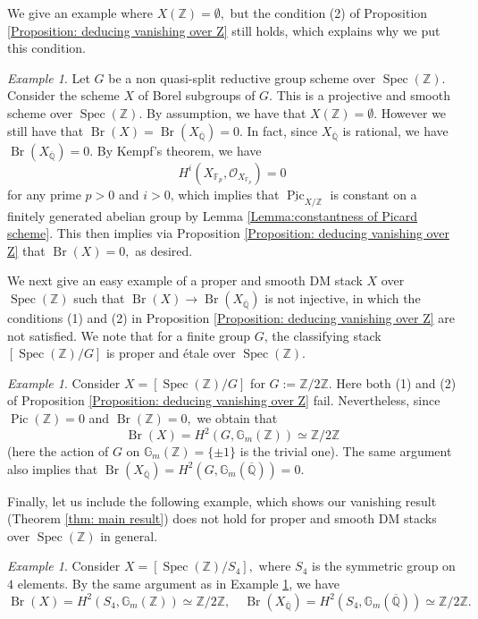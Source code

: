 \documentclass{amsart}
\theoremstyle{definition}
\theoremstyle{remark}
\newtheorem{examp}[prop]{Example}
\DeclareMathOperator{\Spec}{Spec}
\DeclareMathOperator{\Br}{Br}
\DeclareMathOperator{\Pic}{Pic}
\newcommand{\Q}{\mathbb{Q}}
\newcommand{\ZZ}{\mathbb Z}
\newcommand{\QQ}{\mathbb Q}
\newcommand{\Fp}{\mathbb F_p}
\begin{document}
We give an example where $X(\ZZ)=\emptyset,$ but the condition (2)
of Proposition \ref{Proposition: deducing vanishing over Z} still holds, which explains why we put this condition.

\begin{examp}\label{examp: flag}
    Let $G$ be a non quasi-split reductive group scheme over $\Spec(\ZZ).$
    Consider the scheme $X$ of Borel subgroups of $G.$ This is a projective and smooth scheme over $\Spec(\ZZ).$
    By assumption, we have that $X(\ZZ)=\emptyset.$
    However we still have that
    $\Br(X)=\Br(X_{\overline{\QQ}})=0.$
    In fact, since $X_{\overline{\QQ}}$ is rational, we have $\Br(X_{\overline{\QQ}})=0$.
    By Kempf's theorem, we have
    \[
    H^i(X_{\Fp}, \mathcal{O}_{X_{\Fp}})=0
    \]
    for any prime $p >0$ and $i > 0$, which implies that $\underline{\Pic}_{X/\ZZ}$ is constant on a finitely generated abelian group by Lemma \ref{Lemma:constantness of Picard scheme}.
    This then implies via Proposition \ref{Proposition: deducing vanishing over Z} that $\Br(X)=0,$ as desired.
\end{examp}

We next give an easy example
of a proper and smooth DM stack $X$ over $\Spec(\ZZ)$
such that $\Br(X) \to \Br(X_{\overline{\Q}})$ is not injective, in which the conditions (1) and (2) in Proposition \ref{Proposition: deducing vanishing over Z} are not satisfied.
We note that for a finite group $G$, the classifying stack
$[\Spec(\ZZ)/G]$
is proper and \'etale over $\Spec(\ZZ)$.


\begin{examp}\label{examp: Brauer over integers not zero}
    Consider $X=[\Spec(\ZZ)/G]$
    for $G:=\ZZ/2\ZZ$.
    Here both (1) and (2) of Proposition \ref{Proposition: deducing vanishing over Z} fail.
    Nevertheless, since $\Pic(\ZZ)=0$ and $\Br(\ZZ)=0,$ we obtain that
    $$
    \Br(X)=H^{2}(G, \mathbb{G}_{m}(\ZZ)) \simeq \ZZ/2\ZZ
    $$
    (here the action of $G$ on $\mathbb{G}_{m}(\ZZ)=\lbrace \pm 1 \rbrace$ is the trivial one).
    The same argument also implies that
    $\Br(X_{\overline{\Q}})= H^{2}(G, \mathbb{G}_{m}(\overline{\Q}))= 0.$
\end{examp}

Finally, let us include the following example,
which shows our vanishing result (Theorem \ref{thm: main result}) does not hold for proper and smooth DM stacks over $\Spec (\ZZ)$ in general.


\begin{examp}\label{examp: Brauer over geometric generic fiber not zero}
    Consider $X=[\Spec(\ZZ)/S_{4}],$ where $S_{4}$ is the symmetric
    group on $4$ elements.
    By the same argument as in Example \ref{examp: Brauer over integers not zero},
    we have
    \[
    \Br(X)=H^{2}(S_4, \mathbb{G}_{m}(\ZZ)) \simeq \ZZ/2\ZZ, \quad \Br(X_{\overline{\Q}})= H^{2}(S_4, \mathbb{G}_{m}(\overline{\Q})) \simeq \ZZ/2\ZZ.
    \]
\end{examp}
\end{document}
